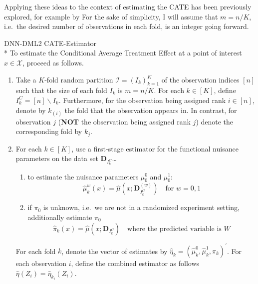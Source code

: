 Applying these ideas to the context of estimating the CATE has been previously explored, for example by \citet{semenova_debiased_2021}
For the sake of simplicity, I will assume that $m = n/K$, i.e.\ the desired number of observations in each fold, is an integer going forward.
\begin{boxD}
	\begin{dfn}{DNN-DML2 CATE-Estimator}\label{def:CATE_DNN_DML}\mbox{}\\*
		To estimate the Conditional Average Treatment Effect at a point of interest $x \in \mathcal{X}$, proceed as follows.
		\begin{enumerate}
			\item Take a $K$-fold random partition $\mathcal{I} = \left(I_k\right)_{k = 1}^{K}$
			      of the observation indices $[n]$ such that the size of each fold $I_k$ is $m =
				      n/K$. For each $k \in [K]$, define $I_{k}^{C} = [n] \backslash I_k$.
			      Furthermore, for the observation being assigned rank $i \in [n]$, denote by
			      $k_{(i)}$ the fold that the observation appears in.
                  In contrast, for observation $j$ (\textbf{NOT} the observation being assigned rank $j$) denote the corresponding fold by $k_j$.
			\item For each $k \in [K]$, use a first-stage estimator for the functional nuisance parameters on the data set
			      $\mathbf{D}_{I_k^C}$\dots
			      \begin{enumerate}
				      \item to estimate the nuisance parameters $\mu_{0}^{0}$ and $\mu_{0}^{1}$:
				            \begin{equation}
					            \hat{\mu}_{k}^{w}\left(x\right) = \hat{\mu}\left(x; \mathbf{D}_{I_k^{C}}^{(w)}\right) \quad \text{for } w=0,1
				            \end{equation}
				      \item if $\pi_{0}$ is unknown, i.e.\ we are not in a randomized experiment setting,
				            additionally estimate $\pi_{0}$
				            \begin{equation}
					            \hat{\pi}_{k}\left(x\right) = \hat{\mu}\left(x; \mathbf{D}_{I_k^{C}}\right) \quad \text{where the predicted variable is $W$}
				            \end{equation}
			      \end{enumerate}
            For each fold $k$, denote the vector of estimates by $\hat{\eta}_{k} = \left(\hat{\mu}_{k}^{0}, \hat{\mu}_{k}^{1}, \hat{\pi}_{k}\right)^{\prime}$.
            For each observation $i$, define the combined estimator as follows $\hat{\eta}(Z_i) = \hat{\eta}_{k_{i}}(Z_i)$.

\end{enumerate}
\end{dfn}
\end{boxD}
